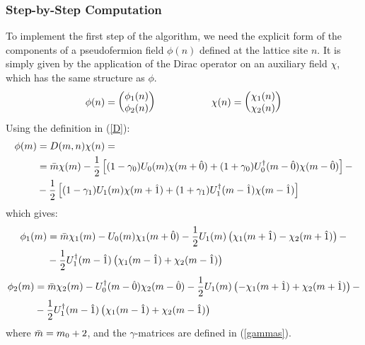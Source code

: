 \subsubsection*{Step-by-Step Computation}
To implement the first step of the algorithm, we need the explicit form of the components of a pseudofermion field $\phi(n)$ defined at the lattice site $n$. It is simply given by the application of the Dirac operator on an auxiliary field $\chi$, which has the same structure as $\phi.$
\begin{equation*}
    \phi(n) = \mqty(\phi_1(n) \\ \phi_2(n)) \hspace{20 mm} \chi(n) = \mqty(\chi_1(n) \\ \chi_2(n))
\end{equation*}
Using the definition in (\ref{D}):
\begin{equation}
\begin{split}
        \phi(m) & = D(m, n) \chi(n) = \\
        & = \Bar{m} \chi(m) - \frac{1}{2} \left[ (1 - \gamma_0)U_0(m) \chi(m + \hat{0}) + (1 + \gamma_0) U_0^\dagger(m - \hat{0}) \chi(m - \hat{0}) \right] - \\
        & - \frac{1}{2} \left[ (1 - \gamma_1)U_1(m) \chi(m + \hat{1}) + (1 + \gamma_1) U_1^\dagger(m - \hat{1}) \chi(m - \hat{1}) \right]
\end{split}
\end{equation}
which gives:
\begin{equation}
    \begin{split}
        \phi_1(m) &= \Bar{m} \chi_1(m) - U_0(m) \chi_1 (m + \hat{0}) - \frac{1}{2} U_1(m) \left( \chi_1(m + \hat{1}) - \chi_2 (m + \hat{1}) \right) - \\
        & - \frac{1}{2} U_1^\dagger(m - \hat{1}) \left( \chi_1 (m - \hat{1}) + \chi_2 (m - \hat{1}) \right)
    \end{split}
\end{equation}
\begin{equation}
    \begin{split}
        \phi_2(m) &= \Bar{m} \chi_2(m) - U_0^\dagger(m - \hat{0}) \chi_2 (m - \hat{0}) - \frac{1}{2} U_1(m) \left( - \chi_1(m + \hat{1}) + \chi_2 (m + \hat{1}) \right) - \\
        & - \frac{1}{2} U_1^\dagger(m - \hat{1}) \left( \chi_1 (m - \hat{1}) + \chi_2 (m - \hat{1}) \right)
    \end{split}
\end{equation}
where $\Bar{m} = m_0 + 2$, and the $\gamma$-matrices are defined in (\ref{gammas}).
